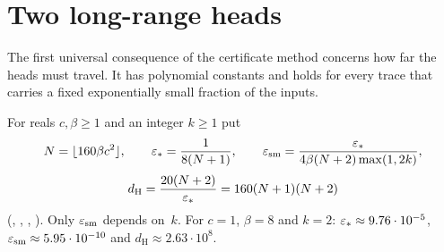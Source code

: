 \section{Two long-range heads}\label{sec:heads}

The first universal consequence of the certificate method concerns how far the heads must travel. It has polynomial constants
and holds for every trace that carries a fixed exponentially small fraction of the inputs.

For reals $c,\beta\ge1$ and an integer $k\ge1$ put
\[
  N=\lfloor160\beta c^2\rfloor,\qquad \varepsilon_*=\frac1{8(N+1)},\qquad \varepsilon_{\mathrm{sm}}=\frac{\varepsilon_*}{4\beta(N+2)\max(1,2k)},
\]
\[
  d_{\mathrm{H}}=\frac{20(N+2)}{\varepsilon_*}=160(N+1)(N+2)
\]
(, , , ). Only $\varepsilon_{\mathrm{sm}}$ depends
on~$k$. For $c=1$, $\beta=8$ and $k=2$: $\varepsilon_*\approx9.76\cdot10^{-5}$, $\varepsilon_{\mathrm{sm}}\approx5.95\cdot10^{-10}$ and
$d_{\mathrm{H}}\approx2.63\cdot10^8$.

